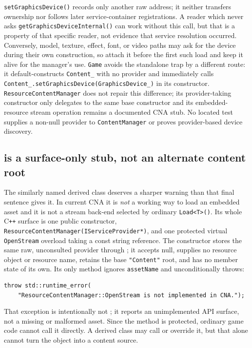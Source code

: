 \texttt{setGraphicsDevice()} records only another raw address; it neither transfers ownership
nor follows later service-container registrations. A reader which never asks
\texttt{getGraphicsDeviceInternal()} can work without this call, but that is a property of that
specific reader, not evidence that service resolution occurred. Conversely, model, texture,
effect, font, or video paths may ask for the device during their own construction, so attach it
before the first such load and keep it alive for the manager's use. \texttt{Game} avoids the
standalone trap by a different route: it default-constructs \texttt{Content\_} with no provider
and immediately calls \texttt{Content\_.setGraphicsDevice(GraphicsDevice\_)} in its constructor.
\texttt{ResourceContentManager} does not repair this difference; its provider-taking constructor
only delegates to the same base constructor and its embedded-resource stream operation remains a
documented CNA stub. No located test supplies a non-null provider to \texttt{ContentManager} or
proves provider-based device discovery.

\subsection{ is a surface-only stub, not an alternate content root}

The similarly named derived class deserves a sharper warning than that final sentence gives it.
In current CNA it is \emph{not} a working way to load an embedded asset and it is not a stream
back-end selected by ordinary \texttt{Load<T>()}. Its whole C\texttt{++} surface is one public
constructor, \texttt{ResourceContentManager(IServiceProvider*)}, and one protected virtual
\texttt{OpenStream} overload taking a const string reference. The constructor stores the same raw,
unconsulted provider through ; it accepts null, supplies no resource
object or resource name, retains the base \texttt{"Content"} root, and has no member state of its
own. Its only method ignores \texttt{assetName} and unconditionally throws:

\begin{lstlisting}
throw std::runtime_error(
    "ResourceContentManager::OpenStream is not implemented in CNA.");
\end{lstlisting}

That exception is intentionally not ; it reports an unimplemented
API surface, not a missing or malformed asset. Since the method is protected, ordinary game code
cannot call it directly. A derived class may call or override it, but that alone cannot turn the
object into a content source.

